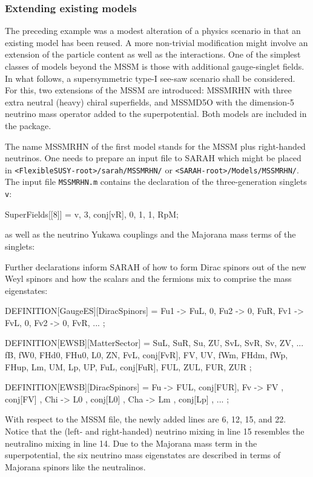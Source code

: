 \documentclass[final,3p,11pt,pdflatex]{elsarticle}
\makeatletter
\newcommand{\sarah}{SARAH\@\xspace}
\newcommand{\fs}{FlexibleSUSY\@\xspace}
\newcommand{\code}[1]{\lstinline|#1|}  %
\makeatother
\begin{document}
\subsubsection{Extending existing models}
\label{sec:extending existing models}

The preceding example was a modest alteration of a physics scenario
in that an existing model has been reused.
A more non-trivial modification might involve
an extension of the particle content as well as the interactions.
One of the simplest classes of models beyond the MSSM is
those with additional gauge-singlet fields.
In what follows, a supersymmetric type-I see-saw scenario
\cite{see-saw} 
shall be considered.
For this, two extensions of the MSSM are introduced:
MSSMRHN with three extra neutral (heavy) chiral superfields,
and MSSMD5O with the dimension-5 neutrino mass operator
added to the superpotential.
Both models are included in the package.

The name MSSMRHN of the first model stands for
the MSSM plus right-handed neutrinos.
One needs to prepare an input file to \sarah which might be placed in
\code{<FlexibleSUSY-root>/sarah/MSSMRHN/} or
\code{<SARAH-root>/Models/MSSMRHN/}.
The input file \code{MSSMRHN.m} contains
the declaration of the three-generation singlets \code{v}:
\begin{numlstlisting}[name=MSSMRHN.m]
SuperFields[[8]] = {v, 3, conj[vR], 0, 1, 1, RpM};
\end{numlstlisting}
as well as the neutrino Yukawa couplings and the Majorana mass terms
of the singlets:
\begin{numlstlisting}[name=MSSMRHN.m]
SuperPotential = Yu u.q.Hu - Yd d.q.Hd - Ye e.l.Hd + \[Mu] Hu.Hd +
                 Yv v.l.Hu + Mv/2 v.v;
\end{numlstlisting}
Further declarations inform \sarah
of how to form Dirac spinors out of the new Weyl spinors
and how the scalars and the fermions mix to comprise
the mass eigenstates:
\begin{numlstlisting}[name=MSSMRHN.m]
DEFINITION[GaugeES][DiracSpinors] = {
  Fu1 -> {FuL, 0}, Fu2 -> {0, FuR},
  Fv1 -> {FvL, 0}, Fv2 -> {0, FvR},
  ...
};

DEFINITION[EWSB][MatterSector] = {
  {{SuL, SuR}, {Su, ZU}},
  {{SvL, SvR}, {Sv, ZV}},
  ...
  {{fB, fW0, FHd0, FHu0}, {L0, ZN}},
  {{FvL, conj[FvR]}, {FV, UV}},
  {{{fWm, FHdm}, {fWp, FHup}}, {{Lm, UM}, {Lp, UP}}},
  {{{FuL}, {conj[FuR]}}, {{FUL, ZUL}, {FUR, ZUR}}}
};

DEFINITION[EWSB][DiracSpinors] = {
  Fu  -> {FUL, conj[FUR]},
  Fv  -> {FV , conj[FV] },
  Chi -> {L0 , conj[L0] },
  Cha -> {Lm , conj[Lp] },
  ...
};
\end{numlstlisting}
With respect to the MSSM file, the newly added lines are
6, 12, 15, and 22.
Notice that the (left- and right-handed) neutrino mixing
in line 15 resembles the neutralino mixing in line 14.
Due to the Majorana mass term in the superpotential,
the six neutrino mass eigenstates are described in terms of
Majorana spinors like the neutralinos.
\end{document}
